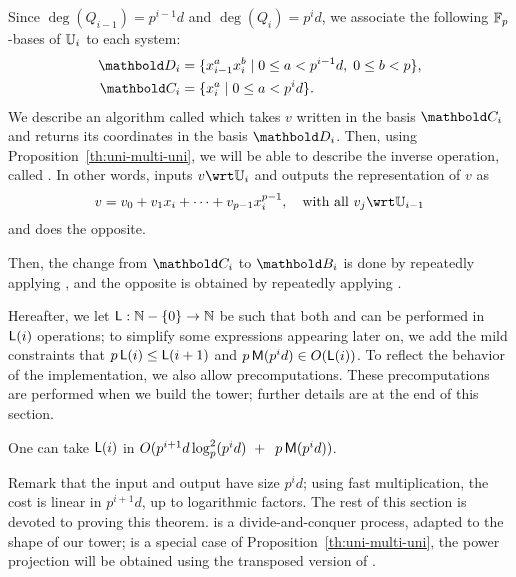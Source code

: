 {\ifafourps{}\fi
Since $\deg(Q_{i-1})=p^{i-1}d$ and $\deg(Q_{i})=p^id$, we associate
the following $\mathbb{F}_p$-bases of $\mathbb{U}_i$ to each system:
\begin{align}
  \pdfmctwo{Explicit indices for the basis.}
  \basis{D}_i &= \{x_{i-1}^ax_i^b \;|\; 0\le a<p^{i-1}d,\; 0\le b<p\}
  \text{,}\\
  \label{eq:bases}
 \basis{C}_i&=\{x_i^a \;|\; 0\le a<p^id\}
 \text{.}  
\end{align}
We describe an algorithm called
 which takes $v$ written in
the basis $\basis{C}_i$ and returns its coordinates in the basis
$\basis{D}_i$. Then, using Proposition~\ref{th:uni-multi-uni}, we will
be able to describe the inverse operation, called
.  In other words,
 inputs $v\wrt\U_i$ and outputs the
representation of $v$ as
\begin{equation}
  \label{eq:vectorspace}
  v = v_0 + v_1x_i + \cdots + v_{p-1}x_i^{p-1}, \quad\text{with all~} v_j \wrt \U_{i-1}
\end{equation}
and  does the opposite.}

Then, the change from $\basis{C}_i$ to $\basis{B}_i$ is done by
repeatedly applying , and the opposite is obtained by
repeatedly applying .

 Hereafter, we let $\mathsf{L}:\mathbb{N}-\{0\} \to \mathbb{N}$ be such that both
 and  can be performed in
$\mathsf{L}(i)$ operations; to simplify some expressions appearing later
on, we add the mild constraints that $p\,\mathsf{L}(i) \le \mathsf{L}(i+1)$ and
$p\,\mathsf{M}(p^{i}d) \in O(\mathsf{L}(i))$.  To reflect the behavior of the
implementation, we also allow precomputations. These precomputations
are performed when we build the tower; further details are at the end
of this section.
\begin{theorem}\label{theo:L}
  One can take $\mathsf{L}(i)$ in $O( p^{i+1}d\log_p^2(p^id) \ + \
\,p\,\mathsf{M}(p^{i}d))$.
\end{theorem}
Remark that the input and output have size $p^id$; using fast
multiplication, the cost is linear in $p^{i+1}d$, up to logarithmic
factors. The rest of this section is devoted to proving this theorem.
\titleref{alg:push-down} is a divide-and-conquer process, adapted to the shape
of our tower; \titleref{alg:liftup} is a special case of
Proposition~\ref{th:uni-multi-uni}, the power projection will be
obtained using the transposed version of \titleref{alg:push-down}.

